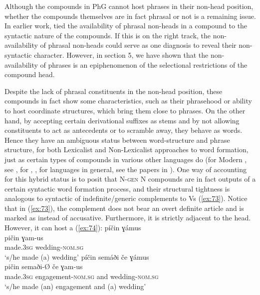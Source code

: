 \documentclass[output=paper]{LSP/langsci}
\begin{document}
Although the compounds in PhG cannot host phrases in their non-head position, whether the compounds themselves are in fact phrasal or not is a remaining issue. In earlier work, \citet{BagriacikRalli2015} tied the availability of phrasal non-heads in a compound to the syntactic nature of the compounds. If this is on the right track, the non-availability of phrasal non-heads could serve as one diagnosis to reveal their non-syntactic character. However, in section 5, we have shown that the non-availability of phrases is an epiphenomenon of the selectional restrictions of the compound head.

Despite the lack of phrasal constituents in the non-head position, these compounds in fact show some characteristics, such as their  phrasehood or ability to host coordinate structures, which bring them close to phrases. On the other hand, by accepting certain derivational suffixes as stems and by not allowing constituents to act as antecedents or to scramble away, they behave as words. Hence they have an ambiguous status between word-structure and phrase structure, for both Lexicalist and Non-Lexicalist approaches to word formation, just as certain types of compounds in various other languages do (for Modern , see \citealt{Ralli2013moderngreek}, for , \citealt{BisettoScalise1999,Bisetto2015}, for  languages in general, see the papers in \citealt{ScaliseMassini2012}). One way of accounting for this hybrid status is to posit that N-\textsc{gen} N compounds are in fact outputs of a certain syntactic word formation process, and their structural tightness is analogous to syntactic  of indefinite/generic complements to Vs (\ref{ex:73}). Notice that in (\ref{ex:73}), the complement does not bear an overt definite article and is marked as  instead of accusative. Furthermore, it is strictly adjacent to the head. However, it can host a  (\ref{ex:74}):
\ea\label{ex:73}
	\glll 	píčin ɣámus\\
			pičin ɣam-us\\
			made.\textsc{3sg} wedding-\textsc{nom.sg}\\
	\glt `s/he made (a) wedding'
\z
\ea\label{ex:74}
	\glll píčin semáði če ɣámus\\
			pičin semaði-{\O} če ɣam-us\\
			made.\textsc{3sg} engagement-\textsc{nom.sg} and wedding-\textsc{nom.sg}\\
	\glt `s/he made (an) engagement and (a) wedding'
\z 
\end{document}
